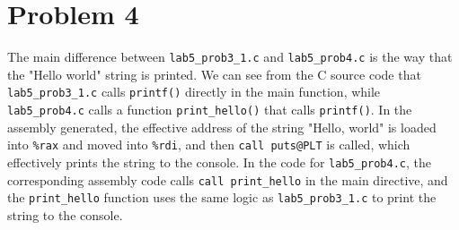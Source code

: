 \documentclass{article}
\begin{document}
\section*{Problem 4}
The main difference between \texttt{lab5\_prob3\_1.c} and \texttt{lab5\_prob4.c} is the way that the "Hello world" string is printed.
We can see from the C source code that \texttt{lab5\_prob3\_1.c} calls \texttt{printf()} directly in the main function, while \texttt{lab5\_prob4.c} calls a function \texttt{print\_hello()} that calls \texttt{printf()}.
In the assembly generated, the effective address of the string "Hello, world" is loaded into \texttt{\%rax} and moved into \texttt{\%rdi}, and then \texttt{call puts@PLT} is called, which effectively prints the string to the console.
In the code for \texttt{lab5\_prob4.c}, the corresponding assembly code calls \texttt{call print\_hello} in the main directive, and the \texttt{print\_hello} function uses the same logic as \texttt{lab5\_prob3\_1.c} to print the string to the console.
\end{document}
